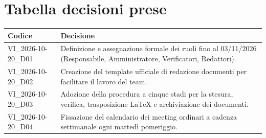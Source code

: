 \section{Tabella decisioni prese}
\renewcommand{\arraystretch}{1.3}
\noindent
\begin{tabularx}{\textwidth}{|l|X|}
    \hline
    \textbf{Codice} & \textbf{Decisione} \\
    \hline
    VI\_2026-10-20\_D01 & Definizione e assegnazione formale dei ruoli fino al 03/11/2026 (Responsabile, Amministratore, Verificatori, Redattori). \\
    \hline
    VI\_2026-10-20\_D02 & Creazione del template ufficiale di redazione documenti per facilitare il lavoro del team. \\
    \hline
    VI\_2026-10-20\_D03 & Adozione della procedura a cinque stadi per la stesura, verifica, trasposizione LaTeX e archiviazione dei documenti. \\
    \hline
    VI\_2026-10-20\_D04 & Fissazione del calendario dei meeting ordinari a cadenza settimanale ogni martedì pomeriggio. \\
    \hline
\end{tabularx}
